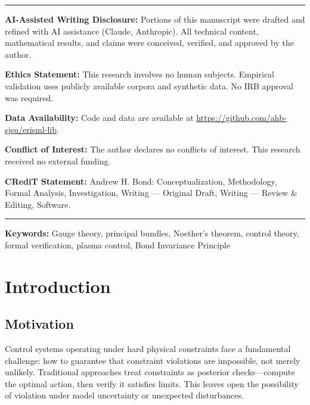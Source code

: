 \documentclass[11pt]{article}
\begin{document}
\begin{titlepage}
\vfill

\noindent\rule{\linewidth}{0.4pt}
\small
\noindent\textbf{AI-Assisted Writing Disclosure:} Portions of this manuscript were drafted and refined with AI assistance (Claude, Anthropic). All technical content, mathematical results, and claims were conceived, verified, and approved by the author.

\noindent\textbf{Ethics Statement:} This research involves no human subjects. Empirical validation uses publicly available corpora and synthetic data. No IRB approval was required.

\noindent\textbf{Data Availability:} Code and data are available at \url{https://github.com/ahb-sjsu/erisml-lib}.

\noindent\textbf{Conflict of Interest:} The author declares no conflicts of interest. This research received no external funding.

\noindent\textbf{CRediT Statement:} Andrew H. Bond: Conceptualization, Methodology, Formal Analysis, Investigation, Writing --- Original Draft, Writing --- Review \& Editing, Software.
\noindent\rule{\linewidth}{0.4pt}
\normalsize

\end{titlepage}

\noindent\textbf{Keywords:} Gauge theory, principal bundles, Noether's theorem, control theory, formal
verification, plasma control, Bond Invariance Principle

\tableofcontents

\newpage

\section{Introduction}

\subsection{Motivation}

Control systems operating under hard physical constraints face a fundamental challenge: how to
guarantee that constraint violations are impossible, not merely unlikely. Traditional approaches
treat constraints as posterior checks---compute the optimal action, then verify it satisfies limits.
This leaves open the possibility of violation under model uncertainty or unexpected disturbances.
\end{document}
